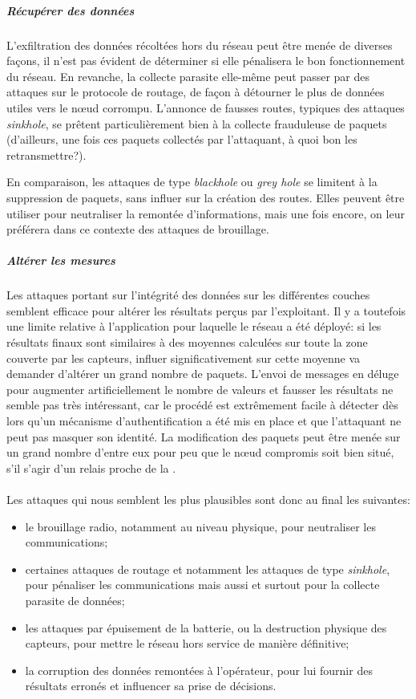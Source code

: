             \subparagraph{Récupérer des données}
L'exfiltration des données récoltées hors du réseau peut être menée de diverses façons, il n'est pas évident de déterminer si elle pénalisera le bon fonctionnement du réseau.
En revanche, la collecte parasite elle-même peut passer par des attaques sur le protocole de routage, de façon à détourner le plus de données utiles vers le nœud corrompu.
L'annonce de fausses routes, typiques des attaques \textit{sinkhole}, se prêtent particulièrement bien à la collecte frauduleuse de paquets (d'ailleurs, une fois ces paquets collectés par l'attaquant, à quoi bon les retransmettre?).

En comparaison, les attaques de type \textit{blackhole} ou \textit{grey hole} se limitent à la suppression de paquets, sans influer sur la création des routes.
Elles peuvent être utiliser pour neutraliser la remontée d'informations, mais une fois encore, on leur préférera dans ce contexte des attaques de brouillage.

            \subparagraph{Altérer les mesures}
Les attaques portant sur l'intégrité des données sur les différentes couches semblent efficace pour altérer les résultats perçus par l'exploitant.
Il y a toutefois une limite relative à l'application pour laquelle le réseau a été déployé: si les résultats finaux sont similaires à des moyennes calculées sur toute la zone couverte par les capteurs, influer significativement sur cette moyenne va demander d'altérer un grand nombre de paquets.
L'envoi de messages en déluge pour augmenter artificiellement le nombre de valeurs et fausser les résultats ne semble pas très intéressant, car le procédé est extrêmement facile à détecter dès lors qu'un mécanisme d'authentification a été mis en place et que l'attaquant ne peut pas masquer son identité.
La modification des paquets peut être menée sur un grand nombre d'entre eux pour peu que le nœud compromis soit bien situé, \cad s'il s'agir d'un relais proche de la \sdb.

        \paragraph{}
Les attaques qui nous semblent les plus plausibles sont donc au final les suivantes:
\begin{itemize}
    \item le brouillage radio, notamment au niveau physique, pour neutraliser les communications;
    \item certaines attaques de routage et notamment les attaques de type \textit{sinkhole}, pour pénaliser les communications mais aussi et surtout pour la collecte parasite de données;
    \item les attaques par épuisement de la batterie, ou la destruction physique des capteurs, pour mettre le réseau hors service de manière définitive;
    \item la corruption des données remontées à l'opérateur, pour lui fournir des résultats erronés et influencer sa prise de décisions.
\end{itemize}

